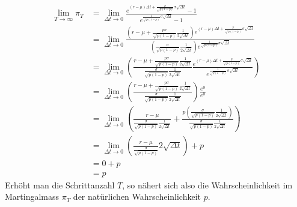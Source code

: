 \documentclass[11pt]{report} %
\begin{document}
\begin{align*}
    \lim_{T \to \infty}\pi_T&=\lim_{\Delta t \to 0}\frac{e^{(r-\mu)\Delta t+\frac{p}{\sqrt{p(1-p)}}\sigma\sqrt{\Delta t}}-1}{e^{\frac{1}{\sqrt{p(1-p)}}\sigma\sqrt{\Delta t}}-1}\\
    &=\lim_{\Delta t \to 0}\frac{(r-\mu+\frac{p\sigma}{\sqrt{p(1-p)}}\frac{1}{2\sqrt{\Delta t}})e^{(r-\mu)\Delta t+\frac{p}{\sqrt{p(1-p)}}\sigma\sqrt{\Delta t}}}{(\frac{\sigma}{\sqrt{p(1-p)}}\frac{1}{2\sqrt{\Delta t}})e^{\frac{1}{\sqrt{p(1-p)}}\sigma\sqrt{\Delta t}}}\\
    &=\lim_{\Delta t \to 0}\left(\frac{r-\mu+\frac{p\sigma}{\sqrt{p(1-p)}}\frac{1}{2\sqrt{\Delta t}}}{\frac{\sigma}{\sqrt{p(1-p)}}\frac{1}{2\sqrt{\Delta t}}}\frac{e^{(r-\mu)\Delta t+\frac{p}{\sqrt{p(1-p)}}\sigma\sqrt{\Delta t}}}{e^{\frac{1}{\sqrt{p(1-p)}}\sigma\sqrt{\Delta t}}}\right)\\
    &=\lim_{\Delta t \to 0}\left(\frac{r-\mu+\frac{p\sigma}{\sqrt{p(1-p)}}\frac{1}{2\sqrt{\Delta t}}}{\frac{\sigma}{\sqrt{p(1-p)}}\frac{1}{2\sqrt{\Delta t}}}\right)\frac{e^0}{e^0}\\
    &=\lim_{\Delta t \to 0}\left(\frac{r-\mu}{\frac{\sigma}{\sqrt{p(1-p)}}\frac{1}{2\sqrt{\Delta t}}}+\frac{p\left(\frac{\sigma}{\sqrt{p(1-p)}}\frac{1}{2\sqrt{\Delta t}}\right)}{\frac{\sigma}{\sqrt{p(1-p)}}\frac{1}{2\sqrt{\Delta t}}}\right)\\
    &=\lim_{\Delta t \to 0}\left(\frac{r-\mu}{\frac{\sigma}{\sqrt{p(1-p)}}}2\sqrt{\Delta t}\right)+p\\
    &=0+p\\
    &=p
\end{align*}
Erhöht man die Schrittanzahl $T$, so nähert sich also die Wahrscheinlichkeit im Martingalmass $\pi_T$ der natürlichen Wahrscheinlichkeit $p$.
\end{document}

